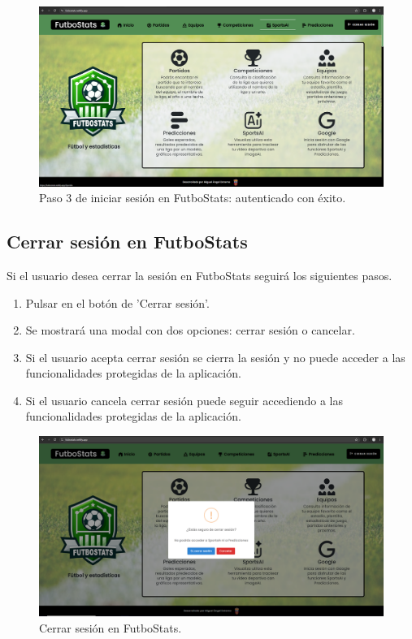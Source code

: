 \begin{figure}[H]
    \centering
    \includegraphics[width=1\linewidth]{img/iniciarSesion3-UM.png}
    \caption{Paso 3 de iniciar sesión en FutboStats: autenticado con éxito.}
    \label{fig:enter-label}
\end{figure}

\subsection{Cerrar sesión en FutboStats}
Si el usuario desea cerrar la sesión en FutboStats seguirá los siguientes pasos.
\begin{enumerate}
    \item Pulsar en el botón de 'Cerrar sesión'.
    \item Se mostrará una modal con dos opciones: cerrar sesión o cancelar.
    \item Si el usuario acepta cerrar sesión se cierra la sesión y no puede acceder a las funcionalidades protegidas de la aplicación.
    \item Si el usuario cancela cerrar sesión puede seguir accediendo a las funcionalidades protegidas de la aplicación.
\end{enumerate}
\begin{figure}[H]
    \centering
    \includegraphics[width=1\linewidth]{img/cerrarSesion-UM.png}
    \caption{Cerrar sesión en FutboStats.}
    \label{fig:enter-label}
\end{figure}

